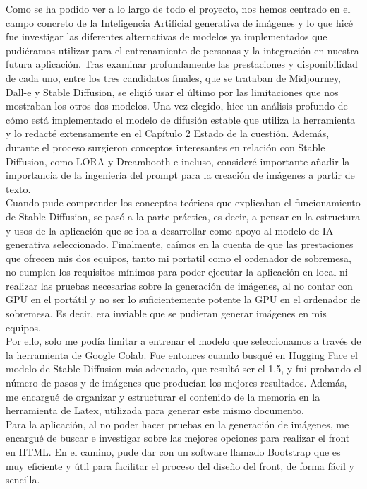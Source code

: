 Como se ha podido ver a lo largo de todo el proyecto, nos hemos centrado en el campo concreto de la Inteligencia Artificial generativa de imágenes y lo que hicé fue investigar las diferentes alternativas de modelos ya implementados que pudiéramos utilizar para el entrenamiento de personas y la integración en nuestra futura aplicación. Tras examinar profundamente las prestaciones y disponibilidad de cada uno, entre los tres candidatos finales, que se trataban de Midjourney, Dall-e y Stable Diffusion, se eligió usar el último por las limitaciones que nos mostraban los otros dos modelos. Una vez elegido, hice un análisis profundo de cómo está implementado el modelo de difusión estable que utiliza la herramienta y lo redacté extensamente en el Capítulo 2 Estado de la cuestión. Además, durante el proceso surgieron conceptos interesantes en relación con Stable Diffusion, como LORA y Dreambooth e incluso, consideré importante añadir la importancia de la ingeniería del prompt para la creación de imágenes a partir de texto. \\

Cuando pude comprender los conceptos teóricos que explicaban el funcionamiento de Stable Diffusion, se pasó a la parte práctica, es decir, a pensar en la estructura y usos de la aplicación que se iba a desarrollar como apoyo al modelo de IA generativa seleccionado. Finalmente, caímos en la cuenta de que las prestaciones que ofrecen mis dos equipos, tanto mi portatil como el ordenador de sobremesa, no cumplen los requisitos mínimos para poder ejecutar la aplicación en local ni realizar las pruebas necesarias sobre la generación de imágenes, al no contar con GPU en el portátil y no ser lo suficientemente potente la GPU en el ordenador de sobremesa. Es decir, era inviable que se pudieran generar imágenes en mis equipos.\\

Por ello, solo me podía limitar a entrenar el modelo que seleccionamos a través de la herramienta de Google Colab. Fue entonces cuando busqué en Hugging Face el modelo de Stable Diffusion más adecuado, que resultó ser el 1.5, y fui probando el número de pasos y de imágenes que producían los mejores resultados. 
Además, me encargué de organizar y estructurar el contenido de la memoria en la herramienta de Latex, utilizada para generar este mismo documento. \\

Para la aplicación, al no poder hacer pruebas en la generación de imágenes, me encargué de buscar e investigar sobre las mejores opciones para realizar el front en HTML. En el camino, pude dar con un software llamado Bootstrap que es muy eficiente y útil para facilitar el proceso del diseño del front, de forma fácil y sencilla.\\
